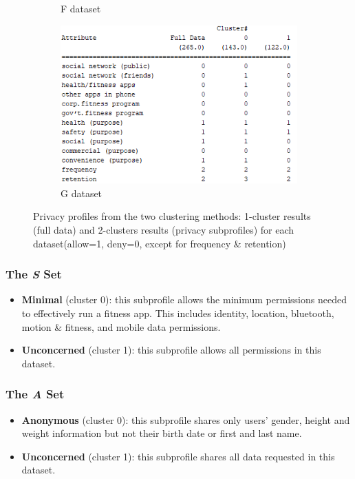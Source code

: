 \begin{figure}
\begin{subfigure}[b]{0.4\linewidth}
		\caption{F dataset}
		\label{fig:fcluster}
	\end{subfigure}
	\begin{subfigure}[b]{0.4\linewidth}
		\includegraphics[width=0.85\linewidth]{figures/G_new2.png}
		\caption{G dataset}
		\label{fig:gcluster}
	\end{subfigure} 
	\caption{Privacy profiles from the two clustering methods:  1-cluster results (full data) and 2-clusters results (privacy subprofiles)  for each dataset(allow=1, deny=0, except for frequency \& retention)}
	\label{fig:privacy_profiles}
\end{figure}


\subsubsection{The \textit{S} Set}
\begin{itemize}
	\item \textbf{Minimal} (cluster 0): this subprofile allows the minimum permissions needed to effectively run a fitness app. This includes identity, location, bluetooth, motion \& fitness, and mobile data permissions.
	
	\item \textbf{Unconcerned} (cluster 1): this subprofile allows all permissions in this dataset.
\end{itemize}

\subsubsection{The \textit{A} Set}
\begin{itemize}
	\item \textbf{Anonymous} (cluster 0): this subprofile shares only users' gender, height and weight information but not their birth date or first and last name.
	
	\item \textbf{Unconcerned} (cluster 1): this subprofile shares all data requested in this dataset.
\end{itemize}

